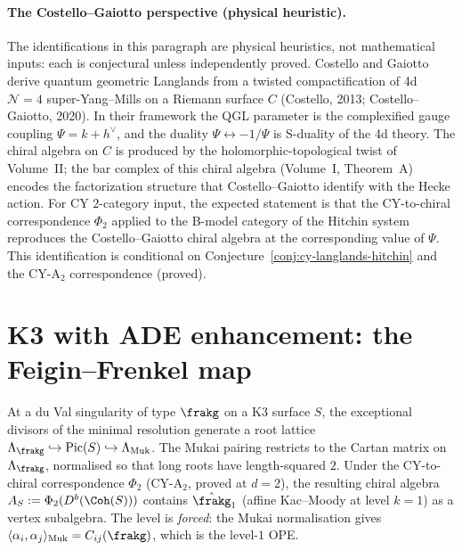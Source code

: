 \paragraph{The Costello--Gaiotto perspective (physical heuristic).}
The identifications in this paragraph are physical heuristics, not mathematical inputs: each is conjectural unless independently proved. Costello and Gaiotto derive quantum geometric Langlands from a twisted compactification of 4d $\mathcal{N} = 4$ super-Yang--Mills on a Riemann surface $C$ (Costello, 2013; Costello--Gaiotto, 2020). In their framework the QGL parameter is the complexified gauge coupling $\Psi = k + h^\vee$, and the duality $\Psi \leftrightarrow -1/\Psi$ is S-duality of the 4d theory. The chiral algebra on $C$ is produced by the holomorphic-topological twist of Volume~II; the bar complex of this chiral algebra (Volume~I, Theorem~A) encodes the factorization structure that Costello--Gaiotto identify with the Hecke action. For CY $2$-category input, the expected statement is that the CY-to-chiral correspondence $\Phi_2$ applied to the B-model category of the Hitchin system reproduces the Costello--Gaiotto chiral algebra at the corresponding value of $\Psi$. This identification is conditional on Conjecture~\ref{conj:cy-langlands-hitchin} and the CY-A$_2$ correspondence (proved).


\section{K3 with ADE enhancement: the Feigin--Frenkel map}
\label{sec:k3-ade-langlands}

At a du Val singularity of type $\frakg$ on a K3 surface $S$, the exceptional divisors of the minimal resolution generate a root lattice $\Lambda_\frakg \hookrightarrow \mathrm{Pic}(S) \hookrightarrow \Lambda_{\mathrm{Muk}}$. The Mukai pairing restricts to the Cartan matrix on $\Lambda_\frakg$, normalised so that long roots have length-squared $2$. Under the CY-to-chiral correspondence $\Phi_2$ (CY-A$_2$, proved at $d = 2$), the resulting chiral algebra $A_S := \Phi_2(D^b(\Coh(S)))$ contains $\hat{\frakg}_1$ (affine Kac--Moody at level $k = 1$) as a vertex subalgebra. The level is \emph{forced}: the Mukai normalisation gives $\langle \alpha_i, \alpha_j \rangle_{\mathrm{Muk}} = C_{ij}(\frakg)$, which is the level-$1$ OPE.

